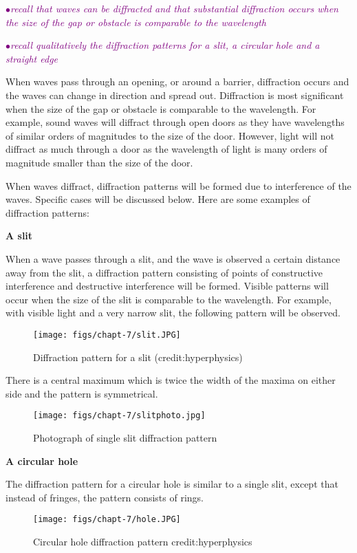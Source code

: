 \documentclass[a4paper,11pt,twoside]{memoir}
\newcounter{spec}[chapter]
\newcommand{\spec}[1]{\Needspace{5\baselineskip}\textcolor{purple}{$\bullet$\hspace{0.5cm}\textit{#1}}}
\begin{document}
\spec{recall that waves can be diffracted and that substantial diffraction occurs when the size of the gap or obstacle is comparable to the wavelength}

\spec{recall qualitatively the diffraction patterns for a slit, a circular hole and a straight edge}

When waves pass through an opening, or around a barrier, diffraction occurs and the waves can change in direction and spread out. Diffraction is most significant when the size of the gap or obstacle is comparable to the wavelength. For example, sound waves will diffract through open doors as they have wavelengths of similar orders of magnitudes to the size of the door. However, light will not diffract as much through a door as the wavelength of light is many orders of magnitude smaller than the size of the door.

When waves diffract, diffraction patterns will be formed due to interference of the waves. Specific cases will be discussed below. Here are some examples of diffraction patterns:

\textbf{A slit}

When a wave passes through a slit, and the wave is observed a certain distance away from the slit, a diffraction pattern consisting of points of constructive interference and destructive interference will be formed. Visible patterns will occur when the size of the slit is comparable to the wavelength. For example, with visible light and a very narrow slit, the following pattern will be observed.

\begin{figure}[h!]
\centering
\texttt{[image: figs/chapt-7/slit.JPG]}
\caption{Diffraction pattern for a slit (credit:hyperphysics)}
\end{figure}

There is a central maximum which is twice the width of the maxima on either side and the pattern is symmetrical.

\begin{figure}[h!]
\centering
\texttt{[image: figs/chapt-7/slitphoto.jpg]}
\caption{Photograph of single slit diffraction pattern}
\end{figure}

\textbf{A circular hole}

The diffraction pattern for a circular hole is similar to a single slit, except that instead of fringes, the pattern consists of rings.

\begin{figure}[h!]
\centering
\texttt{[image: figs/chapt-7/hole.JPG]}
\caption{Circular hole diffraction pattern {credit:hyperphysics}}
\end{figure}
\end{document}
